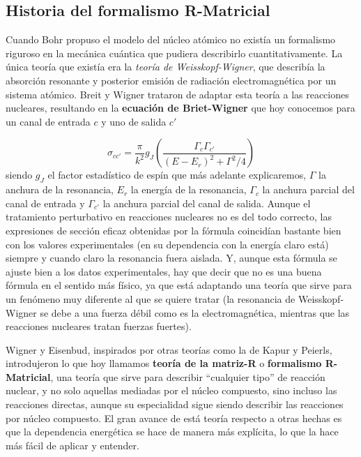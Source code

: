 \documentclass[fleqn,11pt]{SelfArx} %
\newcommand{\parentesis}[1]{\left( #1  \right)}
\begin{document}
\subsection{Historia del formalismo R-Matricial}

Cuando Bohr propuso el modelo del núcleo atómico no existía un formalismo riguroso en la mecánica cuántica que pudiera describirlo cuantitativamente. La única teoría que existía era la \textit{teoría de Weisskopf-Wigner}, que describía la absorción resonante y posterior emisión de radiación electromagnética por un sistema atómico. Breit y Wigner trataron de adaptar esta teoría a las reacciones nucleares, resultando en la \textbf{ecuación de Briet-Wigner} que hoy conocemos para un canal de entrada $c$ y uno de salida $c'$ \cite{FNyP} 

\begin{equation}
	\sigma_{cc'} = \frac{\pi}{k^2} g_J \parentesis{\frac{\Gamma_{c} \Gamma_{c'}}{(E-E_r)^2 + \Gamma^2 / 4}}
\end{equation}
siendo $g_J$ el factor estadístico de espín que más adelante explicaremos, $\Gamma$ la anchura de la resonancia, $E_r$ la energía de la resonancia, $\Gamma_{c}$ la anchura parcial del canal de entrada y $\Gamma_{c'}$ la anchura parcial del canal de salida. Aunque el tratamiento perturbativo en reacciones nucleares no es del todo correcto, las expresiones de sección eficaz obtenidas por la fórmula coincidían bastante bien con los valores experimentales (en su dependencia con la energía claro está) siempre y cuando claro la resonancia fuera aislada. Y, aunque esta fórmula se ajuste bien a los datos experimentales, hay que decir que no es una buena fórmula en el sentido más físico, ya que está adaptando una teoría que sirve para un fenómeno muy diferente al que se quiere tratar (la resonancia de Weisskopf-Wigner se debe a una fuerza débil como es la electromagnética, mientras que las reacciones nucleares tratan fuerzas fuertes).

Wigner y Eisenbud, inspirados por otras teorías como la de Kapur y Peierls, introdujeron lo que hoy llamamos \textbf{teoría de la matriz-R} o \textbf{formalismo R-Matricial}, una teoría que sirve para describir ``cualquier tipo'' de reacción nuclear, y no solo aquellas mediadas por el núcleo compuesto, sino incluso las reacciones directas, aunque su especialidad sigue siendo describir las reacciones por núcleo compuesto. El gran avance de está teoría respecto a otras hechas es que la dependencia energética se hace de manera más explícita, lo que la hace más fácil de aplicar y entender.
\end{document}
